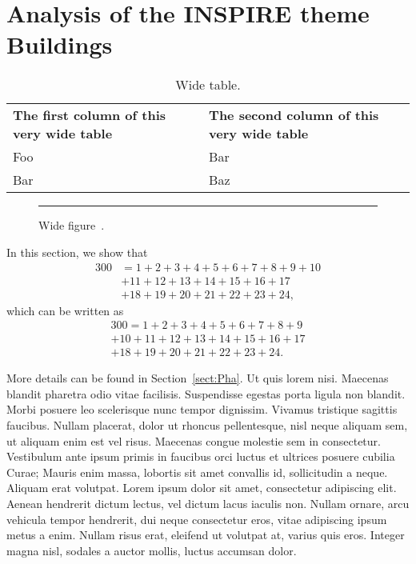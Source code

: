 \documentclass[eprint]{actapoly}
\begin{document}
\section{Analysis of the INSPIRE theme Buildings}




\begin{table*}
\centering
\begin{tabular}{ll}
\toprule
\bfseries The first column of this very wide table & \bfseries The second column of this very wide table
\\\Midrule
Foo & Bar
\\\midrule
Bar & Baz
\\\bottomrule
\end{tabular}
\caption{Wide table.}
\label{tab:wide}
\end{table*}




\begin{figure*}
\centering
\rule{10cm}{5cm} %
\caption{Wide figure~\cite{TeXbook:D,booktabs}.}
\label{fig:gr_a}
\end{figure*}




In this section, we show that
\begin{align}
	300 &= 1+2+3+4+5+6+7+8+9+10
\nonumber\\
	& +11+12+13+14+15+16+17
\nonumber\\
	& +18+19+20+21+22+23+24,
\end{align}
which can be written as
\begin{multline}
	300 = 1+2+3+4+5+6+7+8+9
\\
	+10+11+12+13+14+15+16+17
\\
	+18+19+20+21+22+23+24.
\end{multline}

More details can be found in Section~\ref{sect:Pha}.
Ut quis lorem nisi.
Maecenas blandit pharetra odio vitae facilisis.
Suspendisse egestas porta ligula non blandit.
Morbi posuere leo scelerisque nunc tempor dignissim.
Vivamus tristique sagittis faucibus.
Nullam placerat, dolor ut rhoncus pellentesque, nisl neque aliquam sem, ut aliquam enim est vel risus.
Maecenas congue molestie sem in consectetur.
Vestibulum ante ipsum primis in faucibus orci luctus et ultrices posuere cubilia Curae;
 Mauris enim massa, lobortis sit amet convallis id, sollicitudin a neque.
Aliquam erat volutpat.
Lorem ipsum dolor sit amet, consectetur adipiscing elit.
Aenean hendrerit dictum lectus, vel dictum lacus iaculis non.
Nullam ornare, arcu vehicula tempor hendrerit, dui neque consectetur eros, vitae adipiscing ipsum metus a enim.
Nullam risus erat, eleifend ut volutpat at, varius quis eros.
Integer magna nisl, sodales a auctor mollis, luctus accumsan dolor.
\end{document}
